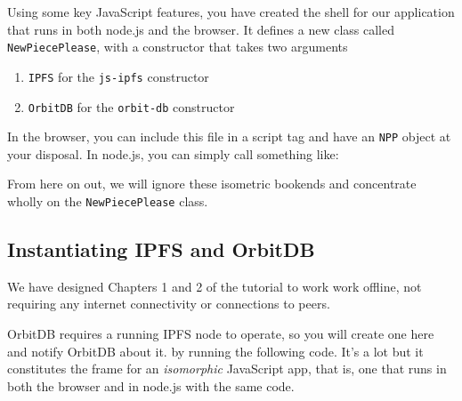 Using some key JavaScript features, you have created the shell for our
application that runs in both node.js and the browser. It defines a new
class called \texttt{NewPiecePlease}, with a constructor that takes two
arguments

\begin{enumerate}
\def\labelenumi{\arabic{enumi}.}
\tightlist
\item
  \texttt{IPFS} for the \texttt{js-ipfs} constructor
\item
  \texttt{OrbitDB} for the \texttt{orbit-db} constructor
\end{enumerate}

In the browser, you can include this file in a script tag and have an
\texttt{NPP} object at your disposal. In node.js, you can simply call
something like:

\begin{Shaded}
\begin{Highlighting}[]
\OperatorTok{=} \NormalTok{(}\NormalTok{)}
\end{Highlighting}
\end{Shaded}

From here on out, we will ignore these isometric bookends and
concentrate wholly on the \texttt{NewPiecePlease} class.

\hypertarget{instantiating-ipfs-and-orbitdb}{\subsection{Instantiating
IPFS and OrbitDB}\label{instantiating-ipfs-and-orbitdb}}

We have designed Chapters 1 and 2 of the tutorial to work work offline,
not requiring any internet connectivity or connections to peers.

OrbitDB requires a running IPFS node to operate, so you will create one
here and notify OrbitDB about it. by running the following code. It's a
lot but it constitutes the frame for an \emph{isomorphic} JavaScript
app, that is, one that runs in both the browser and in node.js with the
same code.

